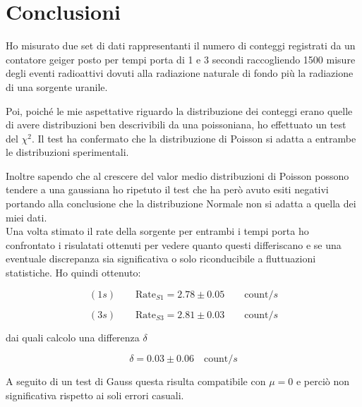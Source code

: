 \documentclass{article}
\begin{document}
\section{Conclusioni}





Ho misurato due set di dati rappresentanti il numero di conteggi registrati da un contatore geiger posto per tempi porta di 1 e 3 secondi raccogliendo 1500 misure degli eventi radioattivi dovuti alla radiazione naturale di fondo più la radiazione di una sorgente uranile.


Poi, poiché le mie aspettative riguardo la distribuzione dei conteggi erano quelle di avere distribuzioni ben descrivibili da una poissoniana, ho effettuato un test del $\chi^2$. Il test ha confermato che la distribuzione di Poisson si adatta a entrambe le distribuzioni sperimentali. 


Inoltre sapendo che al crescere del valor medio distribuzioni di Poisson possono tendere a una gaussiana ho ripetuto il test che ha però avuto esiti negativi portando alla conclusione che la distribuzione Normale non si adatta a quella dei miei dati.\\


\noindent
Una volta stimato il rate della sorgente per entrambi i tempi porta ho confrontato i risulatati ottenuti per vedere quanto questi differiscano e se una eventuale discrepanza sia significativa o solo riconducibile a fluttuazioni statistiche. Ho quindi ottenuto:

\[
	(1s) \qquad \text{Rate}_{S1} = 2.78 \pm 0.05 \qquad \text{count}/s
\]

\[
	(3s) \qquad \text{Rate}_{S3} =  2.81 \pm 0.03  \qquad \text{count}/s
\]

dai quali calcolo una differenza $\delta$

\[
	\delta = 0.03 \pm 0.06 \quad \text{count}/s	
\]

A seguito di un test di Gauss questa risulta compatibile con $\mu = 0$ e perciò non significativa rispetto ai soli errori casuali.
\end{document}
